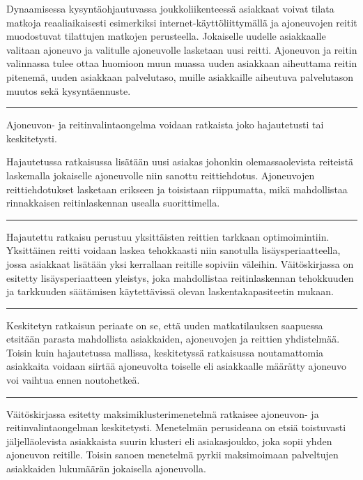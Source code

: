 \documentclass[a4paper,12pt]{article}
\newcommand*\sepline{%
  \begin{center}
    \rule[1ex]{.5\textwidth}{.5pt}
  \end{center}}
\begin{document}

Dynaamisessa kysyntäohjautuvassa joukkoliikenteessä asiakkaat voivat tilata matkoja reaaliaikaisesti esimerkiksi internet-käyttöliittymällä ja 
ajoneuvojen reitit muodostuvat tilattujen matkojen perusteella. Jokaiselle uudelle asiakkaalle valitaan ajoneuvo ja 
valitulle ajoneuvolle lasketaan uusi reitti. Ajoneuvon ja reitin valinnassa tulee ottaa huomioon muun muassa 
uuden asiakkaan aiheuttama reitin pitenemä, uuden asiakkaan palvelutaso, muille asiakkaille aiheutuva palvelutason muutos sekä kysyntäennuste.

\sepline

Ajoneuvon- ja reitinvalintaongelma voidaan ratkaista joko hajautetusti tai keskitetysti. 

Hajautetussa ratkaisussa lisätään uusi asiakas johonkin olemassaolevista reiteistä laskemalla jokaiselle 
ajoneuvolle niin sanottu reittiehdotus. Ajoneuvojen reittiehdotukset lasketaan erikseen ja toisistaan riippumatta, 
mikä mahdollistaa rinnakkaisen reitinlaskennan usealla suorittimella. %

\sepline

Hajautettu ratkaisu perustuu yksittäisten reittien tarkkaan optimoimintiin. Yksittäinen reitti voidaan laskea
tehokkaasti niin sanotulla lisäysperiaatteella, jossa asiakkaat lisätään yksi kerrallaan reitille sopiviin väleihin. 
Väitöskirjassa on esitetty lisäysperiaatteen yleistys, joka mahdollistaa reitinlaskennan tehokkuuden ja tarkkuuden 
säätämisen käytettävissä olevan laskentakapasiteetin mukaan. 

\sepline

Keskitetyn ratkaisun periaate on se, että uuden matkatilauksen saapuessa etsitään parasta mahdollista asiakkaiden, 
ajoneuvojen ja reittien yhdistelmää. Toisin kuin hajautetussa mallissa, keskitetyssä ratkaisussa noutamattomia asiakkaita voidaan siirtää
ajoneuvolta toiselle eli asiakkaalle määrätty ajoneuvo voi vaihtua ennen noutohetkeä. 

\sepline

Väitöskirjassa esitetty maksimiklusterimenetelmä ratkaisee ajoneuvon- ja reitinvalintaongelman keskitetysti. 
Menetelmän perusideana on etsiä toistuvasti jäljelläolevista asiakkaista suurin klusteri eli asiakasjoukko, joka sopii yhden ajoneuvon reitille. 
Toisin sanoen menetelmä pyrkii maksimoimaan palveltujen asiakkaiden lukumäärän jokaisella ajoneuvolla.
\end{document}
